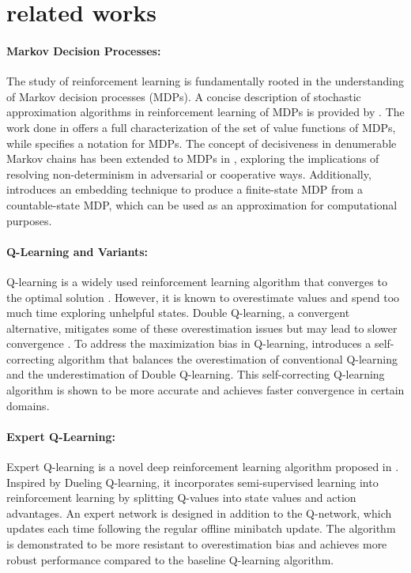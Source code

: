 \section{related works}
\paragraph{Markov Decision Processes:}
The study of reinforcement learning is fundamentally rooted in the understanding of Markov decision processes (MDPs). A concise description of stochastic approximation algorithms in reinforcement learning of MDPs is provided by \cite{1512.07669}. The work done in \cite{1511.02377} offers a full characterization of the set of value functions of MDPs, while \cite{1512.09075} specifies a notation for MDPs. The concept of decisiveness in denumerable Markov chains has been extended to MDPs in \cite{2008.10426}, exploring the implications of resolving non-determinism in adversarial or cooperative ways. Additionally, \cite{0711.2185} introduces an embedding technique to produce a finite-state MDP from a countable-state MDP, which can be used as an approximation for computational purposes.

\paragraph{Q-Learning and Variants:}
Q-learning is a widely used reinforcement learning algorithm that converges to the optimal solution \cite{2303.08631}. However, it is known to overestimate values and spend too much time exploring unhelpful states. Double Q-learning, a convergent alternative, mitigates some of these overestimation issues but may lead to slower convergence \cite{2303.08631}. To address the maximization bias in Q-learning, \cite{2012.01100} introduces a self-correcting algorithm that balances the overestimation of conventional Q-learning and the underestimation of Double Q-learning. This self-correcting Q-learning algorithm is shown to be more accurate and achieves faster convergence in certain domains.

\paragraph{Expert Q-Learning:}
Expert Q-learning is a novel deep reinforcement learning algorithm proposed in \cite{2106.14642}. Inspired by Dueling Q-learning, it incorporates semi-supervised learning into reinforcement learning by splitting Q-values into state values and action advantages. An expert network is designed in addition to the Q-network, which updates each time following the regular offline minibatch update. The algorithm is demonstrated to be more resistant to overestimation bias and achieves more robust performance compared to the baseline Q-learning algorithm.

